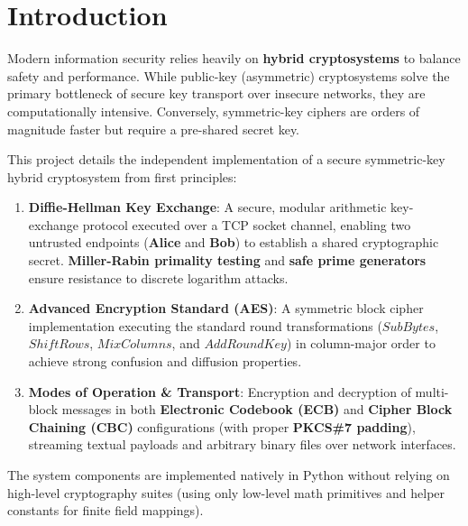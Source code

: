 \documentclass[11pt,a4paper]{article}
\begin{document}
\newpage
\thispagestyle{empty}

\tableofcontents
\newpage
\listoffigures
\vspace{1em}
\listoftables
\newpage
{}

\section{Introduction}
Modern information security relies heavily on \textbf{hybrid cryptosystems} to balance safety and performance. While public-key (asymmetric) cryptosystems solve the primary bottleneck of secure key transport over insecure networks, they are computationally intensive. Conversely, symmetric-key ciphers are orders of magnitude faster but require a pre-shared secret key. 

This project details the independent implementation of a secure symmetric-key hybrid cryptosystem from first principles:
\begin{enumerate}
    \item \textbf{Diffie-Hellman Key Exchange}: A secure, modular arithmetic key-exchange protocol executed over a TCP socket channel, enabling two untrusted endpoints (\textbf{Alice} and \textbf{Bob}) to establish a shared cryptographic secret. \textbf{Miller-Rabin primality testing} and \textbf{safe prime generators} ensure resistance to discrete logarithm attacks.
    \item \textbf{Advanced Encryption Standard (AES)}: A symmetric block cipher implementation executing the standard round transformations ($SubBytes$, $ShiftRows$, $MixColumns$, and $AddRoundKey$) in column-major order to achieve strong confusion and diffusion properties.
    \item \textbf{Modes of Operation \& Transport}: Encryption and decryption of multi-block messages in both \textbf{Electronic Codebook (ECB)} and \textbf{Cipher Block Chaining (CBC)} configurations (with proper \textbf{PKCS\#7 padding}), streaming textual payloads and arbitrary binary files over network interfaces.
\end{enumerate}

The system components are implemented natively in Python without relying on high-level cryptography suites (using only low-level math primitives and helper constants for finite field mappings). 
\end{document}
